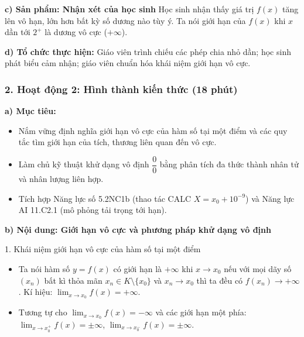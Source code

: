 \documentclass[12pt, a4paper]{article}
\begin{document}
\noindent \textbf{c) Sản phẩm: Nhận xét của học sinh}
Học sinh nhận thấy giá trị $f(x)$ tăng lên vô hạn, lớn hơn bất kỳ số dương nào tùy ý. Ta nói giới hạn của $f(x)$ khi $x$ dần tới $2^+$ là dương vô cực ($+\infty$).

\noindent \textbf{d) Tổ chức thực hiện:}
Giáo viên trình chiếu các phép chia nhỏ dần; học sinh phát biểu cảm nhận; giáo viên chuẩn hóa khái niệm giới hạn vô cực.

\subsubsection*{2. Hoạt động 2: Hình thành kiến thức (18 phút)}

\noindent \textbf{a) Mục tiêu:}
\begin{itemize}[leftmargin=0.6cm]
    \item Nắm vững định nghĩa giới hạn vô cực của hàm số tại một điểm và các quy tắc tìm giới hạn của tích, thương liên quan đến vô cực.
    \item Làm chủ kỹ thuật khử dạng vô định $\dfrac{0}{0}$ bằng phân tích đa thức thành nhân tử và nhân lượng liên hợp.
    \item Tích hợp Năng lực số 5.2NC1b (thao tác CALC $X = x_0 + 10^{-9}$) và Năng lực AI 11.C2.1 (mô phỏng tải trọng tới hạn).
\end{itemize}

\noindent \textbf{b) Nội dung: Giới hạn vô cực và phương pháp khử dạng vô định}

\begin{pedabox}{1. Khái niệm giới hạn vô cực của hàm số tại một điểm}
\begin{itemize}[leftmargin=0.6cm]
    \item Ta nói hàm số $y = f(x)$ có giới hạn là $+\infty$ khi $x \to x_0$ nếu với mọi dãy số $(x_n)$ bất kì thỏa mãn $x_n \in K \setminus \{x_0\}$ và $x_n \to x_0$ thì ta đều có $f(x_n) \to +\infty$. Kí hiệu: $\lim_{x \to x_0} f(x) = +\infty$.
    \item Tương tự cho $\lim_{x \to x_0} f(x) = -\infty$ và các giới hạn một phía: $\lim_{x \to x_0^+} f(x) = \pm\infty$, $\lim_{x \to x_0^-} f(x) = \pm\infty$.
\end{itemize}
\end{pedabox}
\end{document}
